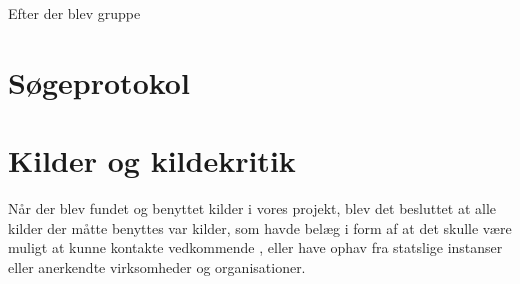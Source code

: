 Efter der blev gruppe

\section{Søgeprotokol}

\section{Kilder og kildekritik}

Når der blev fundet og benyttet kilder i vores projekt, blev det besluttet at alle kilder der måtte benyttes var kilder, som havde belæg i form af at det skulle være muligt at kunne kontakte vedkommende , eller have ophav fra statslige instanser eller anerkendte virksomheder og organisationer. 